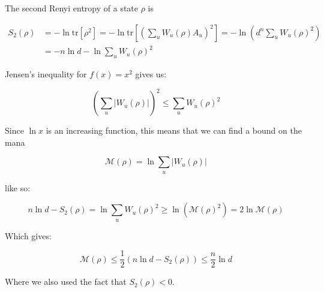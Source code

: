\documentclass{article}
\begin{document}
The second Renyi entropy of a state $\rho$ is 

\begin{align}S_2(\rho)&=-\ln\mathrm{tr}[\rho^2]=-\ln\mathrm{tr}\left[\left(\sum_u W_u(\rho)A_u\right)^2\right]=-\ln\left (d^n\sum_uW_u(\rho)^2\right)\\&=-n\ln d-\ln\sum_u W_u(\rho)^2\end{align}

Jensen's inequality for $f(x)=x^2$ gives us:

\begin{equation} \left(\sum_u|W_u(\rho)|\right)^2\leq \sum_u W_u(\rho)^2\end{equation}

Since $\ln x$ is an increasing function, this means that we can find a bound on the mana 

\begin{equation} \mathcal M(\rho)=\ln \sum_u |W_u(\rho)| \end{equation}

like so:

\begin{equation}n\ln d-S_2(\rho)=\ln\sum_u W_u(\rho)^2\geq \ln\left(\mathcal M(\rho)^2\right)=2\ln \mathcal M(\rho)\end{equation}

Which gives:

\begin{equation}\mathcal M(\rho)\leq \frac{1}{2}\left(n\ln d-S_2(\rho)\right)\leq \frac{n}{2}\ln d\end{equation}

Where we also used the fact that $S_2(\rho)<0$.
\end{document}
